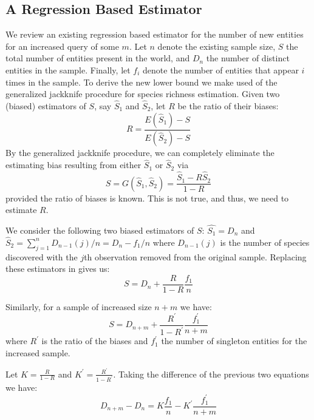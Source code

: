 \documentclass{vldb}
\begin{document}
\subsection{A Regression Based Estimator}
We review an existing regression based estimator for the number of new entities for an increased query of some $m$. Let $n$ denote the existing sample size, $S$ the total number of entities present in the world, and $D_n$ the number of distinct entities in the sample. Finally, let $f_i$ denote the number of entities that appear $i$ times in the sample. To derive the new lower bound we make used of the generalized jackknife procedure for species richness estimation. Given two (biased) estimators of $S$, say $\hat{S}_1$ and $\hat{S}_2$, let $R$ be the ratio of their biases:
\begin{equation}
R = \frac{E(\hat{S}_1) - S}{E(\hat{S}_2) - S}
\end{equation}
By the generalized jackknife procedure, we can completely eliminate the estimating bias resulting from either $\hat{S}_1$ or $\hat{S}_2$ via
\begin{equation}
S = G(\hat{S}_1, \hat{S}_2) = \frac{\hat{S}_1 - R\hat{S}_2}{1 - R}
\label{eq:jknife}
\end{equation}
provided the ratio of biases is known. This is not true, and thus, we need to estimate $R$. 

We consider the following two biased estimators of $S$: $\hat{S_1} = D_n$ and $\hat{S}_2 = \sum_{j=1}^n D_{n-1}(j)/n = D_n - f_1/n$ where $D_{n-1}(j)$ is the number of species discovered with the $j$th observation removed from the original sample. Replacing these estimators in  gives us:
\begin{equation}
S = D_n +\frac{R}{1-R}\frac{f_1}{n}
\end{equation}

Similarly, for a sample of increased size $n+m$ we have:
\begin{equation}
S = D_{n+m} +\frac{R^{\prime}}{1-R^{\prime}}\frac{f^{\prime}_1}{n+m}
\end{equation}
where $R^{\prime}$ is the ratio of the biases and $f^{\prime}_1$ the number of singleton entities for the increased sample.

Let $K = \frac{R}{1-R}$ and $K^{\prime} = \frac{R^{\prime}}{1-R^{\prime}}$. Taking the difference of the previous two equations we have:
\begin{equation}
D_{n+m} - D_{n} = K\frac{f_1}{n} - K^{\prime}\frac{f^{\prime}_1}{n+m}
\end{equation}
\end{document}
